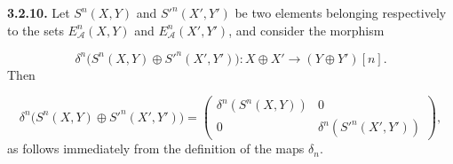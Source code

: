 \medskip\noindent\textbf{3.2.10.}\quad
Let $S^n(X,Y)$ and ${S'}^n(X',Y')$ be two elements belonging respectively
to the sets $E_{\mathcal A}^{n}(X,Y)$ and
$E_{\mathcal A}^{n}(X',Y')$, and consider the morphism

\[
\delta^n\bigl(S^n(X,Y)\oplus {S'}^n(X',Y')\bigr)
\colon X\oplus X'\longrightarrow (Y\oplus Y')[n].
\]
Then

\begin{equation}
\delta^n\bigl(S^n(X,Y)\oplus {S'}^n(X',Y')\bigr)
=
\begin{pmatrix}
\delta^n(S^n(X,Y))&0\\
0&\delta^n({S'}^n(X',Y'))
\end{pmatrix},
\tag{3.2.10.1}
\end{equation}
as follows immediately from the definition of the maps $\delta_n$.
\endgroup
